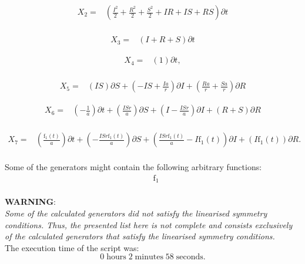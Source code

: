 \begin{align*}
X_{2}=&\left(\frac{I^{2}}{2}+\frac{R^{2}}{2}+\frac{S^{2}}{2}+I R+I S+R S \right)\partial t\\
\end{align*}

\begin{align*}
X_{3}=&\left(I+R+S \right)\partial t
\end{align*}

\begin{align*}
X_{4}=&\left(1 \right)\partial t,\\
\end{align*}

\begin{align*}
X_{5}=&\left(I S \right)\partial S+\left(- I S+\frac{I a}{r} \right)\partial I+\left(\frac{R a}{r}+\frac{S a}{r} \right)\partial R
\end{align*}

\begin{align*}
X_{6}=&\left(- \frac{1}{a} \right)\partial t+\left(\frac{I S r}{a} \right)\partial S+\left(I- \frac{I S r}{a} \right)\partial I+\left(R+S \right)\partial R\\
\end{align*}

\begin{align*}
X_{7}=&\left(\frac{\operatorname{f_{1}}{\left(t \right)}}{a} \right)\partial t+\left(- \frac{I S r \operatorname{f_{1}}{\left(t \right)}}{a} \right)\partial S+\left(\frac{I S r \operatorname{f_{1}}{\left(t \right)}}{a} - I \operatorname{f_{1}}{\left(t \right)} \right)\partial I+\left(I \operatorname{f_{1}}{\left(t \right)} \right)\partial R.\\
\end{align*}



\noindent Some of the generators might contain the following arbitrary functions:
\begin{align*}
&\operatorname{f_{1}}\\
\end{align*}

\noindent\huge\textbf{WARNING}:\\
\noindent\Large\textit{Some of the calculated generators did not satisfy the linearised symmetry conditions. Thus, the presented list here is not complete and consists exclusively of the calculated generators that satisfy the linearised symmetry conditions.}\normalsize\\[2cm]
\noindent The execution time of the script was:
$$0\;\mathrm{hours}\;2\;\mathrm{minutes}\;58 \;\mathrm{seconds}.$$
